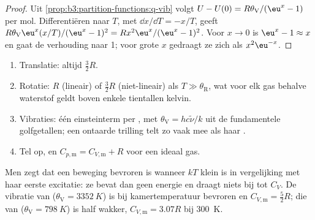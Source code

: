 \begin{proof}
Uit \cref{prop:b3:partition-functions:q-vib} volgt $U - U(0) = R\theta_{\mathrm V}/(\eu^x - 1)$ per mol.
Differentiëren naar $T$, met $\dd x/\dd T = -x/T$, geeft
$R\theta_{\mathrm V}\eu^x(x/T)/(\eu^x - 1)^2 = Rx^2\eu^x/(\eu^x - 1)^2$. Voor $x \to 0$ is $\eu^x - 1 \approx x$ en
gaat de verhouding naar 1; voor grote $x$ gedraagt ze zich als $x^2\eu^{-x}$.
\end{proof}

\begin{method}\label{met:b3:statistical-thermo-applied:cv}
\begin{enumerate}
  \item Translatie: altijd $\frac32R$.
  \item Rotatie: $R$ (lineair) of $\frac32R$ (niet-lineair) als $T \gg \theta_{\mathrm R}$, wat voor
        elk gas behalve waterstof geldt boven enkele tientallen kelvin.
  \item Vibraties: één einsteinterm per , met $\theta_{\mathrm V} = hc\tilde\nu/k$ uit
        de fundamentele golfgetallen; een ontaarde trilling telt zo vaak
        mee als haar .
  \item Tel op, en $C_{p,\mathrm m} = C_{V,\mathrm m} + R$ voor een ideaal gas.
\end{enumerate}
\end{method}

Men zegt dat een beweging bevroren is wanneer $kT$ klein is in vergelijking
met haar eerste excitatie: ze bevat dan geen energie en draagt niets bij
tot $C_V$. De vibratie van  ($\theta_{\mathrm V} = \qty{3352}{K}$) is
bij kamertemperatuur bevroren en
$C_{V,\mathrm m} = \frac52R$; die van  ($\theta_{\mathrm V} = \qty{798}{K}$) is half wakker,
$C_{V,\mathrm m} = 3.07R$ bij \qty{300}{K}.

